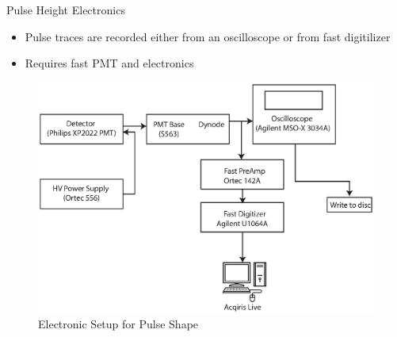 \begin{frame}{Pulse Height Electronics}
	\begin{itemize}
		\small
		\item Pulse traces are recorded either from an oscilloscope or from fast digitilizer
		\item Requires fast PMT and electronics
	\end{itemize}
	\begin{figure}
		\centering
		\includegraphics[height=0.5\textheight]{images/ElectronicsPSD.eps}
		\caption{Electronic Setup for Pulse Shape}
		\label{fig:ElectronicsPSD}
	\end{figure}
\end{frame}
